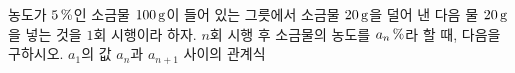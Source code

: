 농도가 $5\mkern3mu \%$인 소금물 $100\mkern3mu \mathrm{g}$이 들어 있는 그릇에서 소금물 $20\mkern3mu \mathrm{g}$을 덜어 낸 다음 물 $20\mkern3mu \mathrm{g}$을 넣는 것을 $1$회 시행이라 하자. $n$회 시행 후 소금물의 농도를 $a_n\mkern3mu \%$라 할 때, 다음을 구하시오.
 $a_1$의 값
 $a_n$과 $a_{n+1}$ 사이의 관계식
